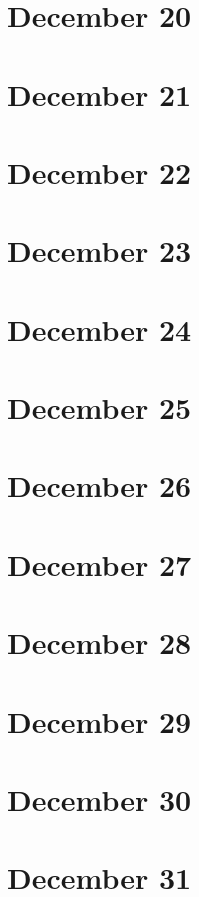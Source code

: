 \section{December 20}

\section{December 21}

\section{December 22}

\section{December 23}

\section{December 24}

\section{December 25}

\section{December 26}

\section{December 27}

\section{December 28}

\section{December 29}

\section{December 30}

\section{December 31}

